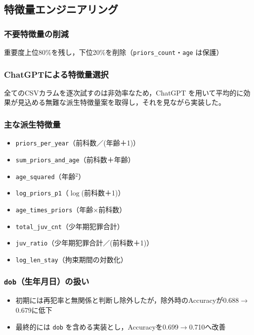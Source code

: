 \documentclass[a4paper,11pt]{article}
\begin{document}
\subsection{特徴量エンジニアリング}
\subsubsection{不要特徴量の削減}
重要度上位80\%を残し，下位20\%を削除（\texttt{priors\_count}・\texttt{age} は保護）

\subsubsection{ChatGPTによる特徴量選択}
全てのCSVカラムを逐次試すのは非効率なため，ChatGPT を用いて平均的に効果が見込める無難な派生特徴量案を取得し，それを見ながら実装した。

\subsubsection{主な派生特徴量}
\begin{itemize}[nosep]
  \item \texttt{priors\_per\_year}（前科数／(年齢＋1)）
  \item \texttt{sum\_priors\_and\_age}（前科数＋年齢）
  \item \texttt{age\_squared}（年齢$^2$）
  \item \texttt{log\_priors\_p1}（$\log$(前科数＋1)）
  \item \texttt{age\_times\_priors}（年齢×前科数）
  \item \texttt{total\_juv\_cnt}（少年期犯罪合計）
  \item \texttt{juv\_ratio}（少年期犯罪合計／(前科数＋1)）
  \item \texttt{log\_len\_stay}（拘束期間の対数化）
\end{itemize}

\subsubsection{\texttt{dob}（生年月日）の扱い}
\begin{itemize}[nosep]
  \item 初期には再犯率と無関係と判断し除外したが，除外時のAccuracyが0.688$\rightarrow$0.679に低下
  \item 最終的には \texttt{dob} を含める実装とし，Accuracyを0.699$\rightarrow$0.710へ改善
\end{itemize}
\end{document}
